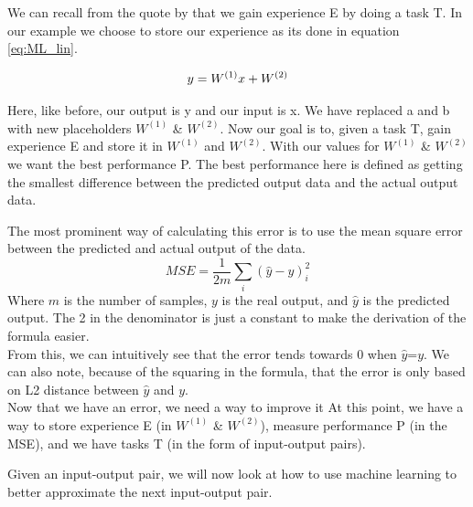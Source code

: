  
We can recall from the quote by \cite{MitchellTomM1997Ml} that we gain experience E by doing a task T. In our example we choose to store our experience as its done in equation \ref{eq:ML_lin}.
    
\begin{equation}
y=W^{(1)}x+W^{(2)}\\
\label{eq:ML_lin}
\end{equation}

Here, like before, our output is y and our input is x. We have replaced a and b with new placeholders $W^{(1)}$ \& $W^{(2)}$.
Now our goal is to, given a task T, gain experience E and store it in $W^{(1)}$ and $W^{(2)}$. With our values for $W^{(1)}$ \& $W^{(2)}$ we want the best performance P.  The best performance here is defined as getting the smallest difference between the predicted output data and the actual output data. 


The most prominent way of calculating this error is to use the mean square error between the predicted and actual output of the data. 
\begin{equation}\label{MSE_form}
     MSE=\frac{1}{2m} \sum_i (\hat{y}-y)_i^2
\end{equation}
Where $m$ is the number of samples, $y$ is the real output, and $\hat{y}$ is the predicted output. The 2 in the denominator is just a constant to make the derivation of the formula easier.\\
    
From this, we can intuitively see that the error tends towards 0 when $\hat{y}$=$y$. We can also note, because of the squaring in the formula, that the error is only based on L2 distance between $\hat{y}$ and $y$.\\

Now that we have an error, we need a way to improve it 
At this point, we have a way to store experience E (in  $W^{(1)}$ \& $W^{(2)}$), measure performance P (in the MSE), and we have tasks T (in the form of input-output pairs).


Given an input-output pair, we will now look at how to use machine learning to better approximate the next input-output pair.

